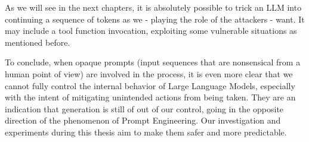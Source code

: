 \documentclass[../thesis.tex]{subfiles}
\begin{document}
As we will see in the next chapters, it is absolutely possible to trick an LLM into continuing a sequence of tokens as we - playing the role of the attackers - want. It may include a tool function invocation, exploiting some vulnerable situations as mentioned before.

To conclude, when opaque prompts (input sequences that are nonsensical from a human point of view)
are involved in the process, it is even more clear that we cannot fully control the internal behavior of Large Language Models, especially with the intent of mitigating unintended actions from being taken. They are an indication that generation is still of out of our control, going in the opposite direction of the phenomenon of Prompt Engineering.
Our investigation and experiments during this thesis aim to make them safer and more predictable.

\subbib{}
\end{document}
